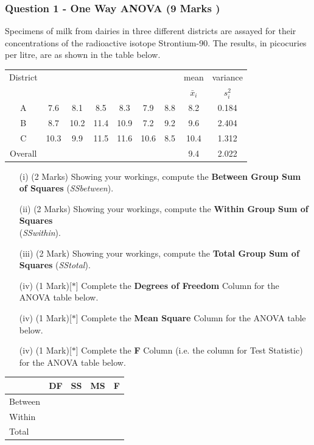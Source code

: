 \documentclass[a4paper,12pt]{article}
\begin{document}
\newpage
	\subsubsection*{Question 1 - One Way ANOVA (9 Marks )}
	Specimens of milk from dairies in three different districts are assayed for their concentrations of the radioactive isotope Strontium-90. 
	The results, in picocuries per litre, are as shown in the table below.
	
	{
		\Large
		\begin{center}
			\begin{tabular}{|c|cccccc|c|c|}
				\hline  
				District & &&&&& & mean & variance \\  
				&  &&&&&& $\bar{x}_i$ & $s^2_{i}$ \\  
				\hline \hline
				A	&	7.6	&	8.1	&	8.5	&	8.3	&	7.9	&	8.8
				&	8.2	&	0.184	\\ \hline
				B	&	8.7	&	10.2	&	11.4	&	10.9	&	7.2	&	9.2
				&	9.6	&	2.404	\\ \hline
				C	&	10.3	&	9.9	&	11.5	&	11.6	&	10.6	&	8.5
				&	10.4	&	1.312	\\ \hline \hline
				Overall & &&&&&&	9.4	&	2.022 \\ \hline	
				
			\end{tabular} 
		\end{center}
	}
	\bigskip
	\begin{itemize}
		\item[(i)] (2 Marks) Showing your workings, compute the \textbf{Between Group Sum of Squares} (\textit{SSbetween}).
		\item[(ii)] (2 Marks) Showing your workings, compute the \textbf{Within Group Sum of Squares}\\ (\textit{SSwithin}).
		\item[(iii)] (2 Mark) Showing your workings, compute the \textbf{Total Group Sum of Squares} (\textit{SStotal}).
		\item[(iv)] (1 Mark)[$\ast$] Complete the \textbf{Degrees of Freedom} Column for the ANOVA table below.
		\item[(iv)] (1 Mark)[$\ast$] Complete the \textbf{Mean Square} Column for the ANOVA table below.
		\item[(iv)] (1 Mark)[$\ast$] Complete the \textbf{F} Column (i.e. the column for Test Statistic) for the ANOVA table below.
	\end{itemize}
	\bigskip
	{
		\LARGE
		\begin{center}
			\begin{tabular}{|l||c|c|c|c|}
				\hline \phantom{makespace} & DF & SS & MS & F \\ \hline
				\hline Between & \phantom{makespa} &  &  &  \\ 
				\hline Within &  &\phantom{makespace}  &  &  \\ \hline
				\hline Total &  \phantom{makespace} &  &\phantom{makespace}  & \phantom{makespace} \\ 
				\hline 
			\end{tabular} 
		\end{center}
	}
\end{document}
